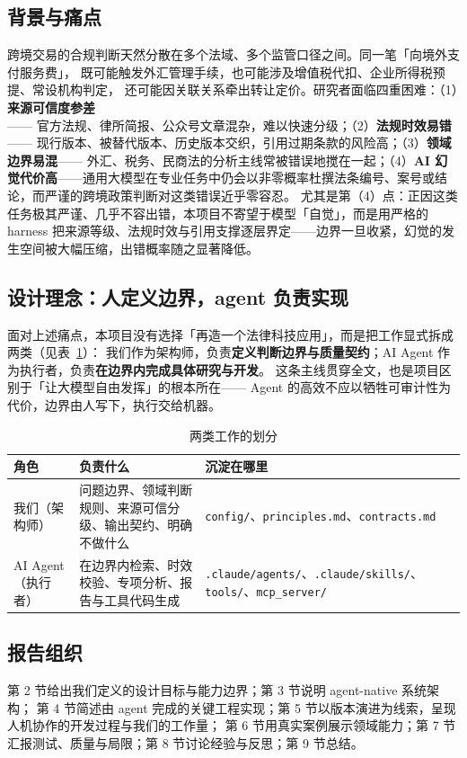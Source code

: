 \documentclass[a4paper,11pt]{ctexart}
\newcommand{\id}[1]{\texttt{#1}}
\begin{document}
\subsection{背景与痛点}
跨境交易的合规判断天然分散在多个法域、多个监管口径之间。同一笔「向境外支付服务费」，
既可能触发外汇管理手续，也可能涉及增值税代扣、企业所得税预提、常设机构判定，
还可能因关联关系牵出转让定价。研究者面临四重困难：（1）\textbf{来源可信度参差}——
官方法规、律所简报、公众号文章混杂，难以快速分级；（2）\textbf{法规时效易错}——
现行版本、被替代版本、历史版本交织，引用过期条款的风险高；（3）\textbf{领域边界易混}——
外汇、税务、民商法的分析主线常被错误地搅在一起；（4）\textbf{AI 幻觉代价高}——通用大模型在专业任务中仍会以非零概率杜撰法条编号、案号或结论，而严谨的跨境政策判断对这类错误近乎零容忍。
尤其是第（4）点：正因这类任务极其严谨、几乎不容出错，本项目不寄望于模型「自觉」，而是用严格的 harness 把来源等级、法规时效与引用支撑逐层界定——边界一旦收紧，幻觉的发生空间被大幅压缩，出错概率随之显著降低。

\subsection{设计理念：人定义边界，agent 负责实现}
面对上述痛点，本项目没有选择「再造一个法律科技应用」，而是把工作显式拆成两类（见表~\ref{tab:roles}）：
我们作为架构师，负责\textbf{定义判断边界与质量契约}；AI Agent 作为执行者，负责\textbf{在边界内完成具体研究与开发}。
这条主线贯穿全文，也是项目区别于「让大模型自由发挥」的根本所在——
Agent 的高效不应以牺牲可审计性为代价，边界由人写下，执行交给机器。

\begin{table}[h]\centering\small
\caption{两类工作的划分}\label{tab:roles}
\begin{tabular}{p{2.6cm}p{6.0cm}p{5.6cm}}
\toprule
\textbf{角色} & \textbf{负责什么} & \textbf{沉淀在哪里} \\
\midrule
我们（架构师） & 问题边界、领域判断规则、来源可信分级、输出契约、明确不做什么 & \id{config/}、\id{principles.md}、\id{contracts.md} \\
AI Agent（执行者） & 在边界内检索、时效校验、专项分析、报告与工具代码生成 & \id{.claude/agents/}、\id{.claude/skills/}、\id{tools/}、\id{mcp\_server/} \\
\bottomrule
\end{tabular}
\end{table}

\subsection{报告组织}
第 2 节给出我们定义的设计目标与能力边界；第 3 节说明 agent-native 系统架构；
第 4 节简述由 agent 完成的关键工程实现；第 5 节以版本演进为线索，呈现人机协作的开发过程与我们的工作量；
第 6 节用真实案例展示领域能力；第 7 节汇报测试、质量与局限；第 8 节讨论经验与反思；第 9 节总结。
\end{document}
